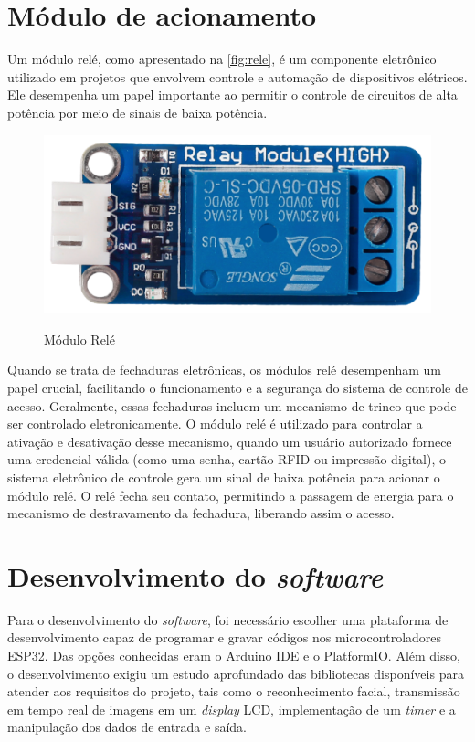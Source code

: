 \section{Módulo de acionamento}\label{sec:acionamento}

Um módulo relé, como apresentado na \autoref{fig:rele}, é um componente 
eletrônico utilizado em projetos que envolvem controle 
e automação de dispositivos elétricos. Ele desempenha 
um papel importante ao permitir o controle de circuitos 
de alta potência por meio de sinais de baixa potência.

\begin{figure}[h!]
    \centering
    \caption{Módulo Relé}
    \includegraphics[scale=0.8]{figuras/rele.png}
    \label{fig:rele}
    \centering
\end{figure}

Quando se trata de fechaduras eletrônicas, os módulos relé desempenham um 
papel crucial, facilitando o funcionamento e a segurança do sistema de 
controle de acesso. Geralmente, essas fechaduras 
incluem um mecanismo de trinco que pode ser controlado eletronicamente. 
O módulo relé é utilizado para controlar a ativação e desativação 
desse mecanismo, quando um usuário autorizado fornece uma credencial 
válida (como uma senha, cartão RFID ou impressão digital), o sistema 
eletrônico de controle gera um sinal de baixa potência para acionar 
o módulo relé. O relé fecha seu contato, permitindo a passagem de 
energia para o mecanismo de destravamento da fechadura, liberando 
assim o acesso.

\section{Desenvolvimento do \textit{software}}\label{sec:software}

Para o desenvolvimento do \textit{software}, foi necessário escolher uma plataforma 
de desenvolvimento capaz de programar e gravar códigos nos microcontroladores 
ESP32. Das opções conhecidas eram o Arduino IDE e o PlatformIO. 
Além disso, o desenvolvimento exigiu um estudo aprofundado das 
bibliotecas disponíveis para atender aos requisitos do projeto, 
tais como o reconhecimento facial, transmissão em tempo real de 
imagens em um \textit{display} LCD, implementação de um \textit{timer} e a manipulação 
dos dados de entrada e saída.

